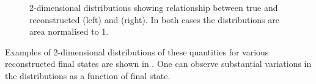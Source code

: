 \begin{figure}[h]
	\begin{minipage}[t]{.5\linewidth}
		\begin{adjustbox}{max totalsize=\linewidth, center}
			
		\end{adjustbox}	
	\end{minipage}
	\hfill
	\begin{minipage}[t]{.5\linewidth}
		\begin{adjustbox}{max totalsize=\linewidth, center}
			
		\end{adjustbox}
	\end{minipage}
	\caption[True vs. reconstructed \evis (left) and \pvis (right)]{2-dimensional distributions showing relationship between true and reconstructed \evis (left) and \pvis (right). In both cases the distributions are area normalised to 1.}
	\label{fig:visibleTrueReco}
\end{figure}

Examples of 2-dimensional distributions of these quantities for various reconstructed final states are shown in .
One can observe substantial variations in the distributions as a function of final state.

